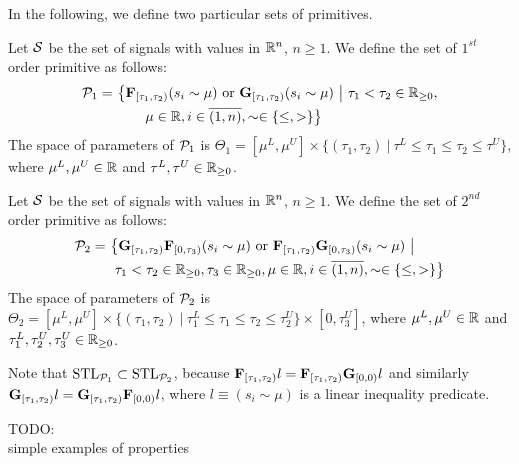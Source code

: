 In the following, we define two particular sets of primitives.

\begin{definition}
\label{def:first-order}
Let $\mathcal{S}$ be the set of signals with values in $\mathbb{R}^n$, $n \geq 1$.
We define the set of $1^{st}$ order primitive as follows:
\begin{align*}
\mathcal{P}_1 =\ & \big\{\mathbf{F}_{[\tau_1, \tau_2)} (s_i \sim \mu) \text{ or } \mathbf{G}_{[\tau_1, \tau_2)} (s_i \sim \mu)  \ \big|\ \tau_1 < \tau_2\in \mathbb{R}_{\geq 0},\\
                 &\qquad \mu \in \mathbb{R}, i\in \overline{(1,n)}, \sim \in \{\leq, >\} \big\}
\end{align*}
The space of parameters of $\mathcal{P}_1$ is $\Theta_1 = [\mu^L, \mu^U] \times \{(\tau_1, \tau_2)\ |\ \tau^L \leq \tau_1 \leq \tau_2 \leq \tau^U\}$,
where $\mu^L, \mu^U \in \mathbb{R}$ and $\tau^L, \tau^U \in \mathbb{R}_{\geq 0}$.
\end{definition}

\begin{definition}
\label{def:second-order}
Let $\mathcal{S}$ be the set of signals with values in $\mathbb{R}^n$, $n \geq 1$.
We define the set of $2^{nd}$ order primitive as follows:
\begin{align*}
\mathcal{P}_2 =\ & \big\{\mathbf{G}_{[\tau_1, \tau_2)}\mathbf{F}_{[0, \tau_3)} (s_i \sim \mu) \text{ or } \mathbf{F}_{[\tau_1, \tau_2)}\mathbf{G}_{[0, \tau_3)} (s_i \sim \mu)  \ \big|\\
               &\ \tau_1 < \tau_2 \in \mathbb{R}_{\geq 0}, \tau_3 \in \mathbb{R}_{\geq 0}, \mu \in \mathbb{R}, i\in \overline{(1,n)}, \sim \in \{\leq, >\} \big\}
\end{align*}
The space of parameters of $\mathcal{P}_2$ is $\Theta_2 = [\mu^L, \mu^U] \times \{(\tau_1, \tau_2)\ |\ \tau^L_1 \leq \tau_1 \leq \tau_2 \leq \tau^U_2\} \times [0, \tau^U_3]$, where $\mu^L, \mu^U \in \mathbb{R}$ and $\tau^L_1, \tau^U_2, \tau^U_3 \in \mathbb{R}_{\geq 0}$.
\end{definition}

Note that $\text{STL}_{\mathcal{P}_1} \subset \text{STL}_{\mathcal{P}_2}$, because $\mathbf{F}_{[\tau_1, \tau_2)} l = \mathbf{F}_{[\tau_1, \tau_2)} \mathbf{G}_{[0, 0)} l$
and similarly $\mathbf{G}_{[\tau_1, \tau_2)} l = \mathbf{G}_{[\tau_1, \tau_2)} \mathbf{F}_{[0, 0)} l$, where $l \equiv (s_i \sim \mu)$ is a linear inequality predicate.


{\color{orange}
TODO:\\
simple examples of properties\\
}


